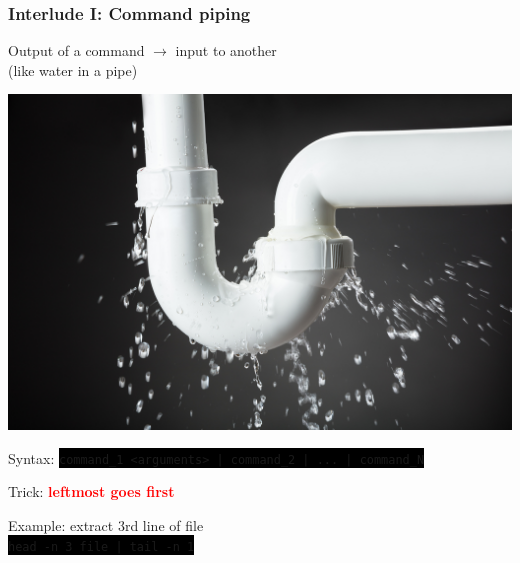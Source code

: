 \documentclass[unknownkeysallowed, 10pt, a4 paper, handout]{beamer}
\newcommand{\focus}[1]{\textbf{\textcolor{red}{#1}}}
\newcommand{\ra}{$\longrightarrow$ }
\newcommand{\code}[1]{\colorbox{black}{\color{green}\texttt{#1}}}
\newcommand{\sidebyside}[5]{
  \begin{minipage}{#1\textwidth}
    #2
  \end{minipage} #3 \begin{minipage}{#4\textwidth}
    #5
  \end{minipage}
}
\begin{document}
\begin{frame}
  \begin{center}
    \frametitle{Interlude I: Command piping}

    \sidebyside{0.60}{
      Output of a command \ra input to another\\
      (like water in a pipe)
    }{\hfill}{0.34}{
      \begin{center}
        \includegraphics[width=1.00\textwidth]{pics/pipe.jpg}
      \end{center}
    }

    Syntax:
    \vspace{0.5mm}
    \code{command\_1 <arguments> | command\_2 | ... | command\_N}

    Trick: \focus{leftmost goes first}

    Example: extract 3rd line of file\\
    \code{head -n 3 file | tail -n 1}
  \end{center}
\end{frame}
\end{document}
